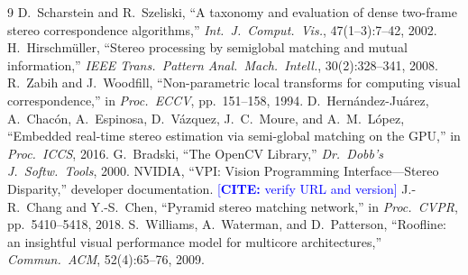 \documentclass[11pt]{article}
\newcommand{\CITE}[1]{\textcolor{blue}{[\textbf{CITE:} #1]}}
\begin{document}

\begin{thebibliography}{9}
 D.~Scharstein and R.~Szeliski, ``A taxonomy and
evaluation of dense two-frame stereo correspondence algorithms,'' \emph{Int.\ J.\ Comput.\ Vis.},
47(1--3):7--42, 2002.
 H.~Hirschm\"uller, ``Stereo processing by
semiglobal matching and mutual information,'' \emph{IEEE Trans.\ Pattern Anal.\ Mach.\ Intell.},
30(2):328--341, 2008.
 R.~Zabih and J.~Woodfill, ``Non-parametric local transforms
for computing visual correspondence,'' in \emph{Proc.\ ECCV}, pp.~151--158, 1994.
 D.~Hern\'andez-Ju\'arez, A.~Chac\'on, A.~Espinosa,
D.~V\'azquez, J.~C.~Moure, and A.~M.~L\'opez, ``Embedded real-time stereo
estimation via semi-global matching on the GPU,'' in \emph{Proc.\ ICCS}, 2016.
 G.~Bradski, ``The OpenCV Library,'' \emph{Dr.\ Dobb's J.\ Softw.\ Tools}, 2000.
 NVIDIA, ``VPI: Vision Programming Interface---Stereo
Disparity,'' developer documentation. \CITE{verify URL and version}
 J.-R.~Chang and Y.-S.~Chen, ``Pyramid stereo matching
network,'' in \emph{Proc.\ CVPR}, pp.~5410--5418, 2018.
 S.~Williams, A.~Waterman, and D.~Patterson, ``Roofline:
an insightful visual performance model for multicore architectures,''
\emph{Commun.\ ACM}, 52(4):65--76, 2009.
\end{thebibliography}
\end{document}
